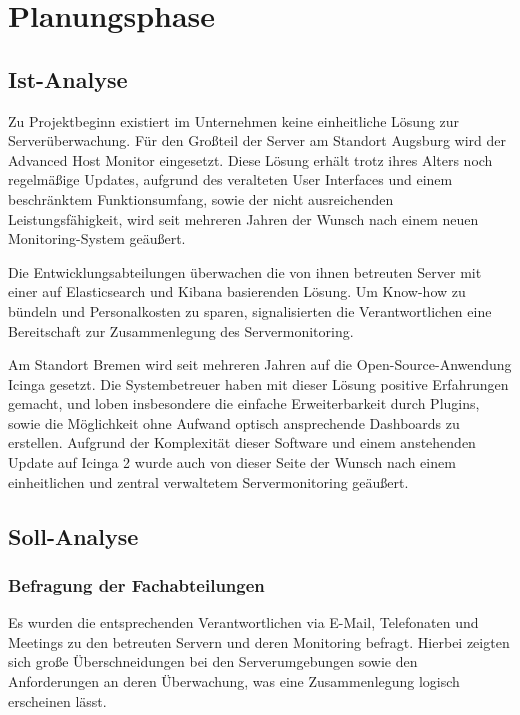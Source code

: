 \section{Planungsphase} 
\label{sec:Planungsphase}

\subsection{Ist-Analyse} 
\label{sec:IstAnalyse}
Zu Projektbeginn existiert im Unternehmen keine einheitliche Lösung zur Serverüberwachung. Für den Großteil der Server am Standort Augsburg wird der \glqq Advanced Host Monitor\grqq{} eingesetzt. Diese Lösung erhält trotz ihres Alters noch regelmäßige Updates, aufgrund des veralteten User Interfaces und einem beschränktem Funktionsumfang, sowie der nicht ausreichenden Leistungsfähigkeit, wird seit mehreren Jahren der Wunsch nach einem neuen Monitoring-System geäußert.

Die Entwicklungsabteilungen überwachen die von ihnen betreuten Server mit einer auf \glqq Elasticsearch\grqq{} und \glqq Kibana\grqq{} basierenden Lösung. Um Know-how zu bündeln und Personalkosten zu sparen, signalisierten die Verantwortlichen eine Bereitschaft zur Zusammenlegung des Servermonitoring.

Am Standort Bremen wird seit mehreren Jahren auf die Open-Source-Anwendung \glqq Icinga\grqq{} gesetzt. Die Systembetreuer haben mit dieser Lösung positive Erfahrungen gemacht, und loben insbesondere die einfache Erweiterbarkeit durch Plugins, sowie die Möglichkeit ohne Aufwand optisch ansprechende Dashboards zu erstellen. Aufgrund der Komplexität dieser Software und einem anstehenden Update auf \glqq Icinga 2\grqq{} wurde auch von dieser Seite der Wunsch nach einem einheitlichen und zentral verwaltetem Servermonitoring geäußert.

\subsection{Soll-Analyse} 
\label{sec:SollAnalyse}

\subsubsection{Befragung der Fachabteilungen}
\label{sec:BefragungFachabteilungen}
Es wurden die entsprechenden Verantwortlichen via E-Mail, Telefonaten und Meetings zu den betreuten Servern und deren Monitoring befragt. Hierbei zeigten sich große Überschneidungen bei den Serverumgebungen sowie den Anforderungen an deren Überwachung, was eine Zusammenlegung logisch erscheinen lässt.

